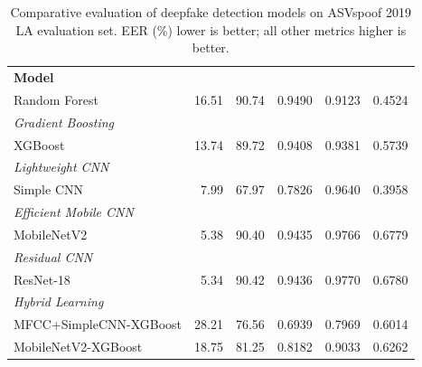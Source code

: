 \begin{table}[ht]
  \centering
  \caption{Comparative evaluation of deepfake detection models on ASVspoof 2019 LA evaluation set. EER (\%) lower is better; all other metrics higher is better.}
  \label{tab:performance}
  \begin{tabular}{lrrrrr}
    \toprule
    \textbf{Model} & \textbf{EER (%
    \midrule
    \multicolumn{6}{l}{\textit{Classical Ensemble}} \\
    Random Forest & 16.51 & 90.74 & 0.9490 & 0.9123 & 0.4524 \\
    \midrule
    \multicolumn{6}{l}{\textit{Gradient Boosting}} \\
    XGBoost & 13.74 & 89.72 & 0.9408 & 0.9381 & 0.5739 \\
    \midrule
    \multicolumn{6}{l}{\textit{Lightweight CNN}} \\
    Simple CNN & 7.99 & 67.97 & 0.7826 & 0.9640 & 0.3958 \\
    \midrule
    \multicolumn{6}{l}{\textit{Efficient Mobile CNN}} \\
    MobileNetV2 & 5.38 & 90.40 & 0.9435 & 0.9766 & 0.6779 \\
    \midrule
    \multicolumn{6}{l}{\textit{Residual CNN}} \\
    ResNet-18 & 5.34 & 90.42 & 0.9436 & 0.9770 & 0.6780 \\
    \midrule
    \multicolumn{6}{l}{\textit{Hybrid Learning}} \\
    MFCC+SimpleCNN-XGBoost & 28.21 & 76.56 & 0.6939 & 0.7969 & 0.6014 \\
    MobileNetV2-XGBoost & 18.75 & 81.25 & 0.8182 & 0.9033 & 0.6262 \\
    \bottomrule
  \end{tabular}
\end{table}
